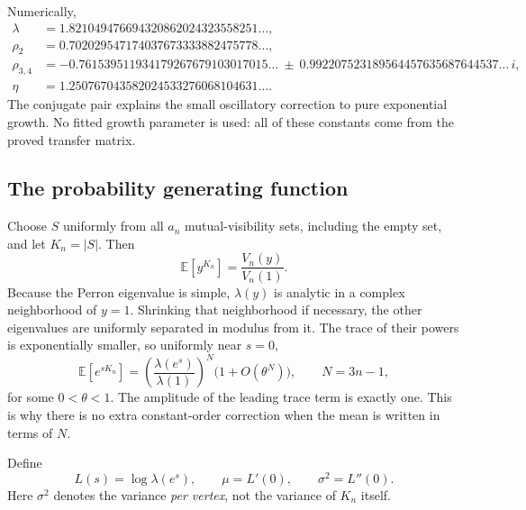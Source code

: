 \documentclass[11pt,a4paper]{article}
\theoremstyle{definition}
\newcommand{\E}{\mathbb E}
\begin{document}
Numerically,
\begin{align*}
\lambda&=1.821049476694320862024323558251\ldots,\\
\rho_2&=0.702029547174037673333882475778\ldots,\\
\rho_{3,4}&=-0.761539511934179267679103017015\ldots
 \ \pm\ 0.992207523189564457635687644537\ldots\,i,\\
\eta&=1.250767043582024533276068104631\ldots.
\end{align*}
The conjugate pair explains the small oscillatory correction to pure
exponential growth. No fitted growth parameter is used: all of these
constants come from the proved transfer matrix.

\subsection{The probability generating function}

Choose $S$ uniformly from all $a_n$ mutual-visibility sets, including the
empty set, and let $K_n=|S|$. Then
\begin{equation}
 \E[y^{K_n}]=\frac{V_n(y)}{V_n(1)}.
 \label{eq:pgf}
\end{equation}
Because the Perron eigenvalue is simple, $\lambda(y)$ is analytic in a
complex neighborhood of $y=1$. Shrinking that neighborhood if necessary,
the other eigenvalues are uniformly separated in modulus from it. The trace
of their powers is exponentially smaller, so uniformly near $s=0$,
\begin{equation}
 \E[e^{sK_n}]
 =\left(\frac{\lambda(e^s)}{\lambda(1)}\right)^N
 \bigl(1+O(\theta^N)\bigr),\qquad N=3n-1,
 \label{eq:quasipowers}
\end{equation}
for some $0<\theta<1$. The amplitude of the leading trace term is exactly
one. This is why there is no extra constant-order correction when the mean
is written in terms of $N$.

Define
\begin{equation}
 L(s)=\log\lambda(e^s),\qquad
 \mu=L'(0),\qquad \sigma^2=L''(0).
 \label{eq:densities}
\end{equation}
Here $\sigma^2$ denotes the variance \emph{per vertex}, not the variance of
$K_n$ itself.
\end{document}
